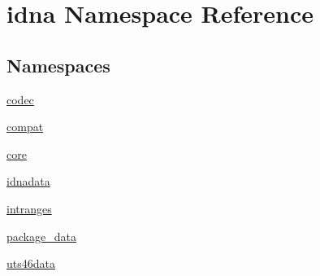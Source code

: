 \hypertarget{namespaceidna}{}\section{idna Namespace Reference}
\label{namespaceidna}
\subsection*{Namespaces}
\begin{DoxyCompactItemize}
\item 
 \hyperlink{namespaceidna_1_1codec}{codec}
\item 
 \hyperlink{namespaceidna_1_1compat}{compat}
\item 
 \hyperlink{namespaceidna_1_1core}{core}
\item 
 \hyperlink{namespaceidna_1_1idnadata}{idnadata}
\item 
 \hyperlink{namespaceidna_1_1intranges}{intranges}
\item 
 \hyperlink{namespaceidna_1_1package__data}{package\+\_\+data}
\item 
 \hyperlink{namespaceidna_1_1uts46data}{uts46data}
\end{DoxyCompactItemize}
